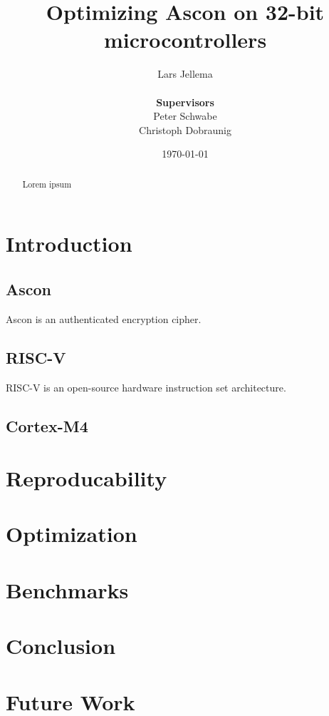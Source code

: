 \documentclass{article}
\title{Optimizing Ascon on 32-bit microcontrollers}
\author{
    Lars Jellema \\\\
    \textbf{\small Supervisors} \\
    \small Peter Schwabe \\
    \small Christoph Dobraunig
}
\date{\today}
\begin{document}
\maketitle

\begin{abstract}
Lorem ipsum
\end{abstract}

\clearpage

\section{Introduction}

\subsection{Ascon}
Ascon\cite{ascon} is an authenticated encryption cipher.

\subsection{RISC-V}
RISC-V\cite{riscv} is an open-source hardware instruction set architecture.

\subsection{Cortex-M4}

\section{Reproducability}


\section{Optimization}



\section{Benchmarks}

\section{Conclusion}

\section{Future Work}



\end{document}
